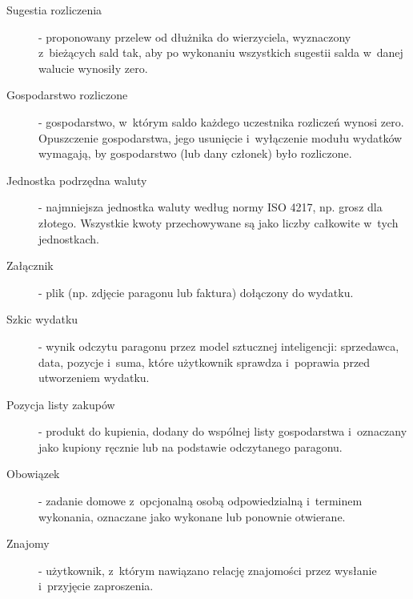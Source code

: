 \begin{description}
  \item[Sugestia rozliczenia] - proponowany przelew od dłużnika do wierzyciela, wyznaczony z~bieżących sald tak, aby po wykonaniu wszystkich sugestii salda w~danej walucie wynosiły zero.
  \item[Gospodarstwo rozliczone] - gospodarstwo, w~którym saldo każdego uczestnika rozliczeń wynosi zero. Opuszczenie gospodarstwa, jego usunięcie i~wyłączenie modułu wydatków wymagają, by gospodarstwo (lub dany członek) było rozliczone.
  \item[Jednostka podrzędna waluty] - najmniejsza jednostka waluty według normy ISO 4217, np. grosz dla złotego. Wszystkie kwoty przechowywane są jako liczby całkowite w~tych jednostkach.
  \item[Załącznik] - plik (np. zdjęcie paragonu lub faktura) dołączony do wydatku.
  \item[Szkic wydatku] - wynik odczytu paragonu przez model sztucznej inteligencji: sprzedawca, data, pozycje i~suma, które użytkownik sprawdza i~poprawia przed utworzeniem wydatku.
  \item[Pozycja listy zakupów] - produkt do kupienia, dodany do wspólnej listy gospodarstwa i~oznaczany jako kupiony ręcznie lub na podstawie odczytanego paragonu.
  \item[Obowiązek] - zadanie domowe z~opcjonalną osobą odpowiedzialną i~terminem wykonania, oznaczane jako wykonane lub ponownie otwierane.
  \item[Znajomy] - użytkownik, z~którym nawiązano relację znajomości przez wysłanie i~przyjęcie zaproszenia.
\end{description}
